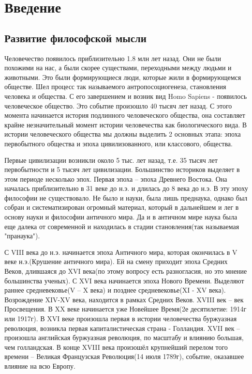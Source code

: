

\section{Введение}

\subsection{Развитие философской мысли}

Человечество появилось приблизительно 1.8 млн лет назад. Они не были похожими на нас, а были скорее существами, переходными между людьми и животными. Это были формирующиеся люди, которые жили в формирующемся обществе. Шел процесс так называемого антропосоциогенеза, становления человека и общества. С его завершением и возник вид Homo Sapiens - появилось человеческое общество. Это событие произошло 40 тысяч лет назад. С этого момента начинается история подлинного человеческого общества, она составляет крайне незначительный момент истории человечества как биологического вида. В истории человеческого общества мы должны выделить 2 основных этапа: эпоха первобытного общества и эпоха цивилизованного, или классового, общества.

Первые цивилизации возникли около 5 тыс. лет назад, т.е. 35 тысяч лет первобытности и 5 тысяч лет цивилизации. Большинство историков выделяет в этом периоде несколько эпох. Первая эпоха – эпоха Древнего Востока. Она началась приблизительно в 31 веке до н.э. и длилась до 8 века до н.э. В эту эпоху философии не существовало. Не было и науки, была лишь преднаука, однако был собран и систематизирован огромный материал, который в дальнейшем и лег в основу науки и философии античного мира. Да и в античном мире наука была еще далека от современной и находилась в стадии становления(так называемая "пранаука").

    С VIII века до н.э. начинается эпоха Античного мира, которая окончилась в V веке н.э.(Крушение античного мира). Ей на смену приходит эпоха Средних Веков, длившаяся до XVI века(по этому вопросу есть разногласия, но это мнение большинства ученых). С XVI века начинается эпоха Нового Времени. Выделяют раннее средневековье(V – X века) и позднее средневековье(XI - XV века). Возрождение XIV-XV века, находится в рамках Средних Веков. XVIII век – век Просвещения. В XX веке начинается уже Новейшее Время(2е десятилетие: 1914г или 1917г). В XVI веке произошла первая в истории человечества буржуазная революция, возникла первая капиталистическая страна - Голландия. XVII век – произошла английская буржуазная революция, по масштабу и влиянию большая, чем голландская. В конце XVIII века произошёл крупнейший перелом того времени – Великая Французская Революция(14 июля 1789г), событие, оказавшее влияние на всю Европу.

